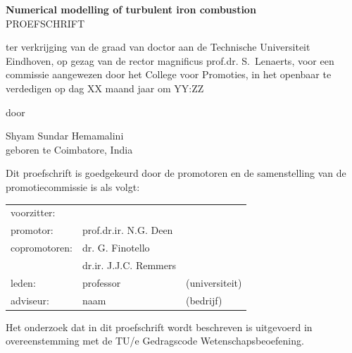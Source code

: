\begin{titlepage}


  \pagecolor{none}
  \thispagestyle{empty}
  \begin{center}
    \null\vspace{0.75cm}\huge
    \textbf{Numerical modelling of turbulent iron combustion\\}
    \vspace{2cm}
    \large
    PROEFSCHRIFT\\
    \vspace{2cm}
    \normalsize
    \parbox{12cm}{\centering ter verkrijging van de graad van doctor aan de Technische Universiteit Eindhoven, op gezag van de rector magnificus prof.dr. S.~Lenaerts, voor een commissie aangewezen door het College voor Promoties, in het openbaar te verdedigen op dag XX maand jaar om YY:ZZ}
	
	
    \vspace{1.5cm}
    door

    \vspace{1.5cm}
    Shyam Sundar Hemamalini\\

    \vspace{1.5cm}
    geboren te Coimbatore, India
    \vfill
  \end{center}

  \newpage
  \normalsize
  \thispagestyle{empty}
  Dit proefschrift is goedgekeurd door de promotoren en de samenstelling van de promotiecommissie is als volgt:\\

  \begin{tabular}{@{}lll}
    voorzitter:  &  &\\
    promotor:    & prof.dr.ir. N.G. Deen &\\
    copromotoren:& dr. G. Finotello &\\
    		 	 & dr.ir. J.J.C. Remmers &\\
    leden:       & professor & (universiteit)\\

    adviseur:	 & naam  & (bedrijf)\\
  \end{tabular}

  \vfill
  Het onderzoek dat in dit proefschrift wordt beschreven is uitgevoerd in overeenstemming met de TU/e Gedragscode Wetenschapsbeoefening.

\end{titlepage}

